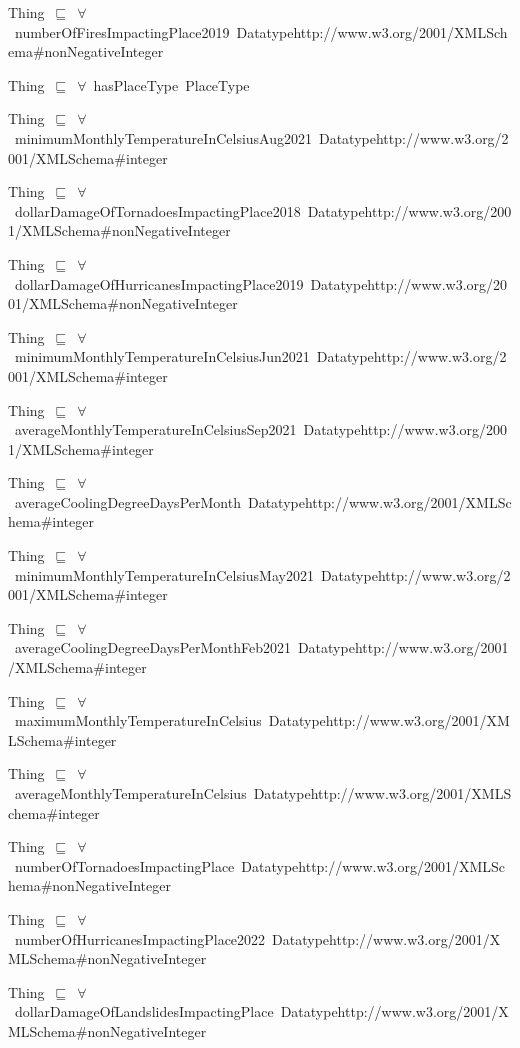 \documentclass{article}
\begin{document}
Thing~\ensuremath{\sqsubseteq}~\ensuremath{\forall}~numberOfFiresImpactingPlace2019~Datatypehttp://www.w3.org/2001/XMLSchema#nonNegativeInteger~

Thing~\ensuremath{\sqsubseteq}~\ensuremath{\forall}~hasPlaceType~PlaceType~

Thing~\ensuremath{\sqsubseteq}~\ensuremath{\forall}~minimumMonthlyTemperatureInCelsiusAug2021~Datatypehttp://www.w3.org/2001/XMLSchema#integer~

Thing~\ensuremath{\sqsubseteq}~\ensuremath{\forall}~dollarDamageOfTornadoesImpactingPlace2018~Datatypehttp://www.w3.org/2001/XMLSchema#nonNegativeInteger~

Thing~\ensuremath{\sqsubseteq}~\ensuremath{\forall}~dollarDamageOfHurricanesImpactingPlace2019~Datatypehttp://www.w3.org/2001/XMLSchema#nonNegativeInteger~

Thing~\ensuremath{\sqsubseteq}~\ensuremath{\forall}~minimumMonthlyTemperatureInCelsiusJun2021~Datatypehttp://www.w3.org/2001/XMLSchema#integer~

Thing~\ensuremath{\sqsubseteq}~\ensuremath{\forall}~averageMonthlyTemperatureInCelsiusSep2021~Datatypehttp://www.w3.org/2001/XMLSchema#integer~

Thing~\ensuremath{\sqsubseteq}~\ensuremath{\forall}~averageCoolingDegreeDaysPerMonth~Datatypehttp://www.w3.org/2001/XMLSchema#integer~

Thing~\ensuremath{\sqsubseteq}~\ensuremath{\forall}~minimumMonthlyTemperatureInCelsiusMay2021~Datatypehttp://www.w3.org/2001/XMLSchema#integer~

Thing~\ensuremath{\sqsubseteq}~\ensuremath{\forall}~averageCoolingDegreeDaysPerMonthFeb2021~Datatypehttp://www.w3.org/2001/XMLSchema#integer~

Thing~\ensuremath{\sqsubseteq}~\ensuremath{\forall}~maximumMonthlyTemperatureInCelsius~Datatypehttp://www.w3.org/2001/XMLSchema#integer~

Thing~\ensuremath{\sqsubseteq}~\ensuremath{\forall}~averageMonthlyTemperatureInCelsius~Datatypehttp://www.w3.org/2001/XMLSchema#integer~

Thing~\ensuremath{\sqsubseteq}~\ensuremath{\forall}~numberOfTornadoesImpactingPlace~Datatypehttp://www.w3.org/2001/XMLSchema#nonNegativeInteger~

Thing~\ensuremath{\sqsubseteq}~\ensuremath{\forall}~numberOfHurricanesImpactingPlace2022~Datatypehttp://www.w3.org/2001/XMLSchema#nonNegativeInteger~

Thing~\ensuremath{\sqsubseteq}~\ensuremath{\forall}~dollarDamageOfLandslidesImpactingPlace~Datatypehttp://www.w3.org/2001/XMLSchema#nonNegativeInteger~
\end{document}
